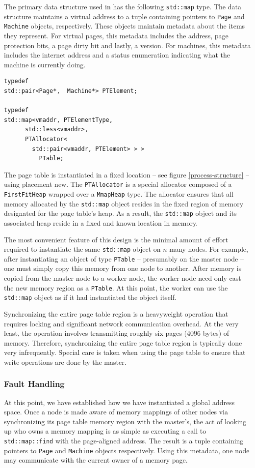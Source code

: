 The primary data structure used in \projname{} has the following \verb,std::map, type.  The data structure maintains a virtual address to a tuple containing pointers to \verb,Page, and \verb,Machine, objects, respectively.  These objects maintain metadata about the items they represent.  For virtual pages, this metadata includes the address, page protection bits, a page dirty bit and lastly, a version.  For machines, this metadata includes the internet address and a status enumeration indicating what the machine is currently doing.

\begin{verbatim}
typedef
std::pair<Page*,  Machine*> PTElement;

typedef
std::map<vmaddr, PTElementType,
      std::less<vmaddr>,
      PTAllocator<
        std::pair<vmaddr, PTElement> > >
          PTable;
\end{verbatim}

The \projname{} page table is instantiated in a fixed location -- see figure \ref{process-structure} -- using placement new.  The \verb,PTAllocator, is a special allocator composed of a \verb,FirstFitHeap, wrapped over a \verb,MmapHeap, type.  The allocator ensures that all memory allocated by the \verb,std::map, object resides in the fixed region of memory designated for the page table's heap.  As a result, the \verb,std::map, object and its associated heap reside in a fixed and known location in memory.

The most convenient feature of this design is the minimal amount of effort required to instantiate the same \verb,std::map, object on $n$ many nodes.  For example, after instantiating an object of type \verb,PTable, -- presumably on the master node -- one must simply copy this memory from one node to another.  After memory is copied from the master node to a worker node, the worker node need only cast the new memory region as a \verb,PTable,.  At this point, the worker can use the \verb,std::map, object as if it had instantiated the object itself.

Synchronizing the entire page table region is a heavyweight operation that requires locking and significant network communication overhead.  At the very least, the operation involves transmitting roughly six pages (4096 bytes) of memory.  Therefore, synchronizing the entire page table region is typically done very infrequently.  Special care is taken when using the page table to ensure that write operations are done by the master.


\subsubsection{Fault Handling}
At this point, we have established how we have instantiated a global address space.  Once a node is made aware of memory mappings of other nodes via synchronizing its page table memory region with the master's, the act of looking up who owns a memory mapping is as simple as executing a call to \verb,std::map::find, with the page-aligned address.  The result is a tuple containing pointers to \verb,Page, and \verb,Machine, objects respectively.  Using this metadata, one node may communicate with the current owner of a memory page.

